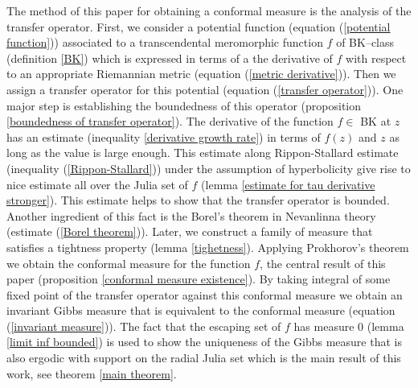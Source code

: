 \documentclass[12pt,reqno]{amsart}
\begin{document}
\noindent The method of this paper for obtaining a conformal measure is the analysis of the transfer operator. First, we consider a potential function (equation (\ref{potential function})) associated to a transcendental meromorphic function $f$ of BK--class (definition \ref{BK}) which is expressed in terms of a the derivative of $f$ with respect to an appropriate Riemannian metric (equation (\ref{metric derivative})). Then we assign a transfer operator for this potential (equation (\ref{transfer operator})). One major step is establishing the boundedness of this operator (proposition \ref{boundedness of transfer operator}). The derivative of the function $f \in$ BK at $z$ has an estimate (inequality \ref{derivative growth rate}) in terms of $f(z)$ and $z$ as long as the value is large enough. This estimate along Rippon-Stallard estimate (inequality (\ref{Rippon-Stallard})) under the assumption of hyperbolicity give rise to nice estimate all over the Julia set of $f$ (lemma \ref{estimate for tau derivative stronger}). This estimate helps to show that the transfer operator is bounded. Another ingredient of this fact is the Borel's theorem  in Nevanlinna theory (estimate (\ref{Borel theorem})). Later, we construct a family of measure that satisfies a tightness property (lemma \ref{tighetness}). Applying Prokhorov's theorem we obtain the conformal measure for the function $f$, the central result of this paper (proposition \ref{conformal measure existence}).  By taking integral of some fixed point of the transfer operator against this conformal measure we obtain an invariant Gibbs measure that is equivalent to the conformal measure (equation (\ref{invariant measure})). The fact that the escaping set of $f$ has measure $0$ (lemma \ref{limit inf bounded}) is used to show the uniqueness of the Gibbs measure that is also ergodic with support on the radial Julia set which is the main result of this work, see theorem \ref{main theorem}.
 
\end{document}
